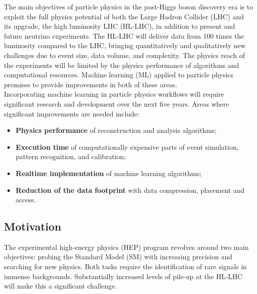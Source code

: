 

The main objectives of particle physics in the post-Higgs boson discovery era is to exploit the full physics potential of both the Large Hadron Collider (LHC) and its upgrade, the high luminosity LHC (HL-LHC), in addition to present and future neutrino experiments.
The HL-LHC will deliver data from 100 times the luminosity compared to the LHC, bringing quantitatively and qualitatively new challenges due to event size, data volume, and complexity. The physics reach of the experiments will be limited by the physics performance of algorithms and computational resources. Machine learning (ML) applied to particle physics promises to provide improvements in both of these areas.\\

Incorporating machine learning in particle physics workflows will require significant research and development over the next five years. Areas where significant improvements are needed include:
\begin{itemize}
 \item \textbf{Physics performance} of reconstruction and analysis algorithms;
 \item \textbf{Execution time} of computationally expensive parts of event simulation, pattern recognition, and calibration;
 \item \textbf{Realtime implementation} of machine learning algorithms;
 \item \textbf{Reduction of the data footprint} with data compression, placement and access.
\end{itemize}
\noindent

\subsection{Motivation}
The experimental high-energy physics (HEP) program revolves around two main objectives: probing the Standard Model (SM) with increasing precision and searching for new physics. Both tasks require the identification of rare signals in immense backgrounds. Substantially increased levels of pile-up at the HL-LHC will make this a significant challenge.\\

